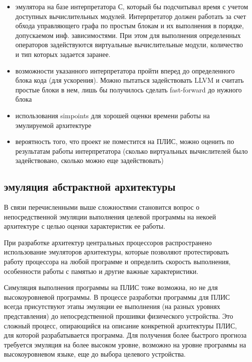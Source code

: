 \documentclass[utf8]{psta}%
\begin{document}
\begin{itemize}
   \item  эмулятора на базе интерпретатора С, который бы подсчитывал время с учетом доступных вычислительных модулей. Интерпретатор должен работать за счет обхода управляющего графа по простым блокам и их выполнения в порядке, допускаемом инф. зависимостями. При этом для выполнения определенных операторов задействуются виртуальные вычислительные модули, количество и тип которых задается заранее.
   \item возможности указанного интерпретатора пройти вперед до определенного блока кода (для ускорения). Можно пытаться задействовать LLVM и считать простые блоки в нем, лишь бы получилось сделать fast-forward до нужного блока
   \item использования simpoints для хорошей оценки времени работы на эмулируемой архитектуре
   \item вероятность того, что проект не поместится на ПЛИС, можно оценить по результатам работы интерпретатора (сколько виртуальных вычислителей было задействовано, сколько можно еще задействовать)
\end{itemize}

\subsection{эмуляция абстрактной архитектуры}

В связи перечисленными выше сложностями становится вопрос о непосредственной эмуляции выполнения целевой программы на некоей архитектуре с целью оценки характеристик ее работы.

При разработке архитектур центральных процессоров распространено использование эмуляторов архитектуры, которые позволяют протестировать работу процессора на любой программе и определить скорость выполнения, особенности работы с памятью и другие важные характеристики. 

Симуляция выполнения программы на ПЛИС тоже возможна, но не для высокоуровневой программы. В процессе разработки программы для ПЛИС всегда присутствуют этапы эмуляции ее выполнения (на разных уровнях представления) до непосредственной прошивки физического устройства. Это сложный процесс, опирающийся на описание конкретной архитектуры ПЛИС, для которой разрабатывается программа. Для получения более быстрого прогноза требуется эмуляция на более высоком уровне, возможно на уровне программы на высокоуровневом языке, еще до выбора целевого устройства.
\end{document}
